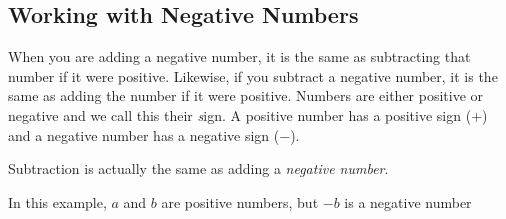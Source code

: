             \subsection{ Working with Negative Numbers}
            \nopagebreak
        \label{m38346*id173878}When you are adding a negative number, it is the same as subtracting that number
if it were positive. Likewise, if you subtract a negative number, it is the same
as adding the number if it were positive. Numbers are either positive or
negative and we call this their \textsl{s}ign. A positive number has a positive
sign ($+$) and a negative number has a negative sign ($-$).\par 
        \label{m38346*id173907}Subtraction is actually the same as adding a \textsl{negative number}.\par 
        \label{m38346*id173916}In this example, $a$ and $b$ are positive numbers, but $-b$ is a negative number\par 
        \label{m38346*uid23}\nopagebreak\noindent{}
